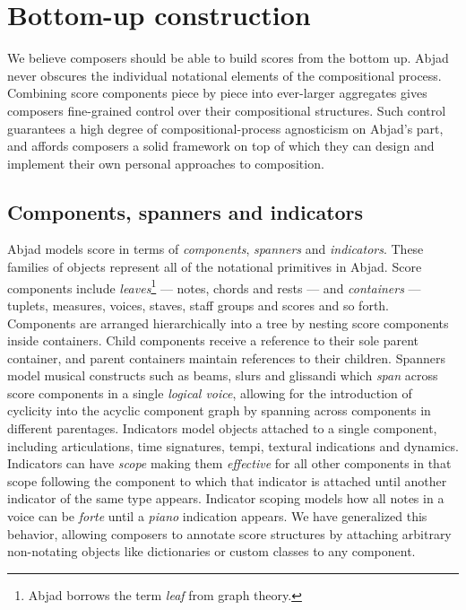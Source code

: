 \documentclass{article}
\begin{document}
\section{Bottom-up construction} \label{sec:bottom-up}

We believe composers should be able to build scores from the bottom up. Abjad
never obscures the individual notational elements of the compositional process.
Combining score components piece by piece into ever-larger aggregates gives
composers fine-grained control over their compositional structures. Such
control guarantees a high degree of compositional-process agnosticism on
Abjad's part, and affords composers a solid framework on top of which they can
design and implement their own personal approaches to composition.


\subsection{Components, spanners and indicators}

Abjad models score in terms of \emph{components}, \emph{spanners} and
\emph{indicators}. These families of objects represent all of the notational
primitives in Abjad. Score components include \emph{leaves}\footnote{Abjad
borrows the term \emph{leaf} from graph theory.} --- notes, chords and rests
--- and \emph{containers} --- tuplets, measures, voices, staves, staff groups
and scores and so forth. Components are arranged hierarchically into a tree by
nesting score components inside containers. Child components receive a
reference to their sole parent container, and parent containers maintain
references to their children. Spanners model musical constructs such as beams,
slurs and glissandi which \emph{span} across score components in a single
\emph{logical voice}, allowing for the introduction of cyclicity into the
acyclic component graph by spanning across components in different parentages.
Indicators model objects attached to a single component, including
articulations, time signatures, tempi, textural indications and dynamics.
Indicators can have \emph{scope} making them \emph{effective} for all other
components in that scope following the component to which that indicator is
attached until another indicator of the same type appears. Indicator scoping
models how all notes in a voice can be \emph{forte} until a \emph{piano}
indication appears. We have generalized this behavior, allowing composers to
annotate score structures by attaching arbitrary non-notating objects like
dictionaries or custom classes to any component.
\end{document}
